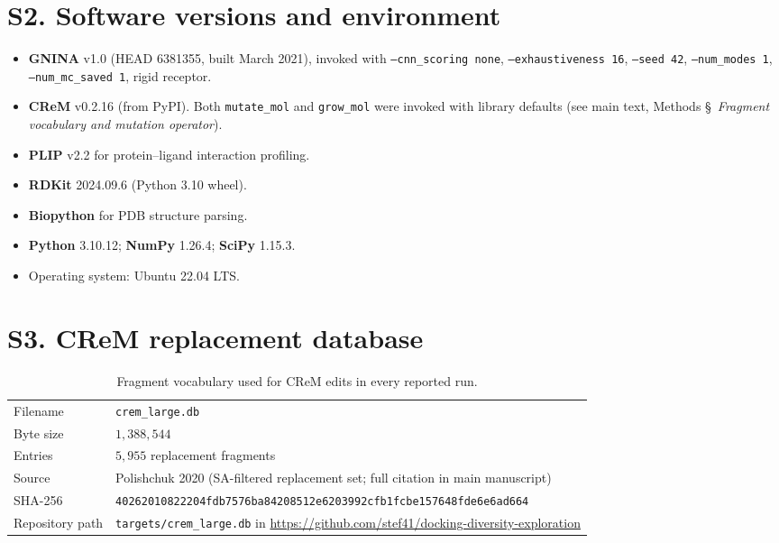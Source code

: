 \documentclass[journal=jcisd8,manuscript=suppinfo]{achemso}
\begin{document}
\section*{S2. Software versions and environment}

\begin{itemize}
    \item \textbf{GNINA} v1.0 (HEAD 6381355, built March 2021), invoked with \texttt{--cnn\_scoring none}, \texttt{--exhaustiveness 16}, \texttt{--seed 42}, \texttt{--num\_modes 1}, \texttt{--num\_mc\_saved 1}, rigid receptor.
    \item \textbf{CReM} v0.2.16 (from PyPI). Both \texttt{mutate\_mol} and \texttt{grow\_mol} were invoked with library defaults (see main text, Methods \S~\emph{Fragment vocabulary and mutation operator}).
    \item \textbf{PLIP} v2.2 for protein--ligand interaction profiling.
    \item \textbf{RDKit} 2024.09.6 (Python 3.10 wheel).
    \item \textbf{Biopython} for PDB structure parsing.
    \item \textbf{Python} 3.10.12; \textbf{NumPy} 1.26.4; \textbf{SciPy} 1.15.3.
    \item Operating system: Ubuntu 22.04 LTS.
\end{itemize}

\section*{S3. CReM replacement database}

\begin{table}[ht]
\centering
\caption{Fragment vocabulary used for CReM edits in every reported run.}
\small
\begin{tabular}{@{}l>{\raggedright\arraybackslash}p{}@{}}
\toprule
Filename & \texttt{crem\_large.db} \\
Byte size & $1{,}388{,}544$ \\
Entries & $5{,}955$ replacement fragments \\
Source & Polishchuk 2020 (SA-filtered replacement set; full citation in main manuscript) \\
SHA-256 & \texttt{40262010822204fdb7576ba842\allowbreak 08512e6203992cfb1fcbe157648fde6e6ad664} \\
Repository path & \texttt{targets/crem\_large.db} in \url{https://github.com/stef41/docking-diversity-exploration} \\
\bottomrule
\end{tabular}
\end{table}
\end{document}
